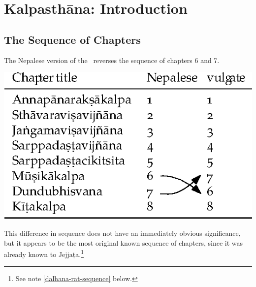\chapter{Kalpasthāna: Introduction}

\section{The Sequence of Chapters}
\label{kalpa-chapter-sequence}
The Nepalese version of the \SS\ reverses the sequence of chapters 6 and 7.  

\begin{table}[h]
    \centering
     \includegraphics[width=0.65\linewidth]{chapters/media/kalpa}
\end{table}


\noindent
This difference in sequence does not have an immediately obvious 
significance, but it appears to be the most original known sequence of 
chapters, since it was already known to Jejjaṭa.\footnote{See note 
\ref{dalhana-rat-sequence} below.}

